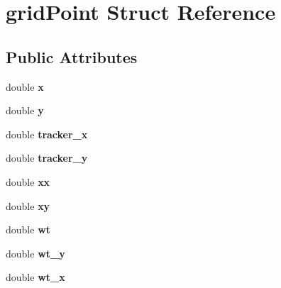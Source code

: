 \hypertarget{structgridPoint}{\section{grid\-Point Struct Reference}
\label{structgridPoint}
}
\subsection*{Public Attributes}
\begin{DoxyCompactItemize}
\item 
\hypertarget{structgridPoint_ab1c55d47ec8b485a1af685354f991714}{double {\bfseries x}}\label{structgridPoint_ab1c55d47ec8b485a1af685354f991714}

\item 
\hypertarget{structgridPoint_ac8c10a167adfb463de6fbc8526e156ca}{double {\bfseries y}}\label{structgridPoint_ac8c10a167adfb463de6fbc8526e156ca}

\item 
\hypertarget{structgridPoint_a00f649e2d19471b7767794e52bde6676}{double {\bfseries tracker\-\_\-x}}\label{structgridPoint_a00f649e2d19471b7767794e52bde6676}

\item 
\hypertarget{structgridPoint_a7fd30928c2c02041c7f62deb8854dd28}{double {\bfseries tracker\-\_\-y}}\label{structgridPoint_a7fd30928c2c02041c7f62deb8854dd28}

\item 
\hypertarget{structgridPoint_acca61af09cbe4e256cbb686161ea5d04}{double {\bfseries xx}}\label{structgridPoint_acca61af09cbe4e256cbb686161ea5d04}

\item 
\hypertarget{structgridPoint_a85d3a8985d716ceae2bd99632ed8082b}{double {\bfseries xy}}\label{structgridPoint_a85d3a8985d716ceae2bd99632ed8082b}

\item 
\hypertarget{structgridPoint_a3722a3b1527d498d83849859b60fa59a}{double {\bfseries wt}}\label{structgridPoint_a3722a3b1527d498d83849859b60fa59a}

\item 
\hypertarget{structgridPoint_af2c9713cedc1a297a974a91026ec4c4a}{double {\bfseries wt\-\_\-y}}\label{structgridPoint_af2c9713cedc1a297a974a91026ec4c4a}

\item 
\hypertarget{structgridPoint_a9a43a257eb6cb45b927f640c8450fc72}{double {\bfseries wt\-\_\-x}}\label{structgridPoint_a9a43a257eb6cb45b927f640c8450fc72}


\end{DoxyCompactItemize}
